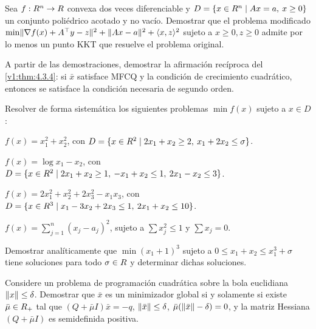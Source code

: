 \begin{exercise}\label{v1:ejer:4.2.13}
 Sea $f : R^n \to R$ convexa dos veces diferenciable y $D = \{ x \in R^n \mid Ax = a, \: x \ge 0 \}$ un conjunto poliédrico acotado y no vacío. Demostrar que el problema modificado $\min \lVert\nabla f(x) + A^\top y - z\rVert^2 + \lVert Ax - a\rVert^2 + \langle x, z \rangle^2$ sujeto a $x \ge 0, z \ge 0$ admite por lo menos un punto KKT que resuelve el problema original.
\end{exercise}


\begin{exercise}\label{v1:ejer:4.3.1}
 A partir de las demostraciones, demostrar la afirmación recíproca del \cref{v1:thm:4.3.4}: si $\bar{x}$ satisface MFCQ y la condición de crecimiento cuadrático, entonces se satisface la condición necesaria de segundo orden.
\end{exercise}

\begin{exercise}\label{v1:ejer:4.3.2}
 Resolver de forma sistemática los siguientes problemas $\min f(x)$ sujeto a $x \in D$:
 \begin{enuthm}
 \item $f(x) = x_1^2 + x_2^2$, con $D = \{ x \in R^2 \mid 2x_1 + x_2 \ge 2, \: x_1 + 2x_2 \le \sigma \}$.
 \item $f(x) = \log x_1 - x_2$, con $D = \{ x \in R^2 \mid 2x_1 + x_2 \ge 1, \: -x_1 + x_2 \le 1, \: 2x_1 - x_2 \le 3 \}$.
 \item $f(x) = 2x_1^2 + x_2^2 + 2x_3^2 - x_1 x_3$, con $D = \{ x \in R^3 \mid x_1 - 3x_2 + 2x_3 \le 1, \: 2x_1 + x_2 \le 10 \}$.
 \item $f(x) = \sum_{j=1}^n (x_j - a_j)^2$, sujeto a $\sum x_j^2 \le 1$ y $\sum x_j = 0$.
 \end{enuthm}
\end{exercise}

\begin{exercise}\label{v1:ejer:4.3.3}
 Demostrar analíticamente que $\min (x_1 + 1)^3$ sujeto a $0 \le x_1 + x_2 \le x_1^3 + \sigma$ tiene soluciones para todo $\sigma \in R$ y determinar dichas soluciones.
\end{exercise}

\begin{exercise}\label{v1:ejer:4.3.4}
 Considere un problema de programación cuadrática sobre la bola euclidiana $\lVert x\rVert \le \delta$. Demostrar que $\bar{x}$ es un minimizador global si y solamente si existe $\bar{\mu} \in R_+$ tal que $(Q + \bar{\mu} I)\bar{x} = -q$, $\lVert\bar{x}\rVert \le \delta$, $\bar{\mu}(\lVert\bar{x}\rVert - \delta) = 0$, y la matriz Hessiana $(Q + \bar{\mu} I)$ es semidefinida positiva.
\end{exercise}


